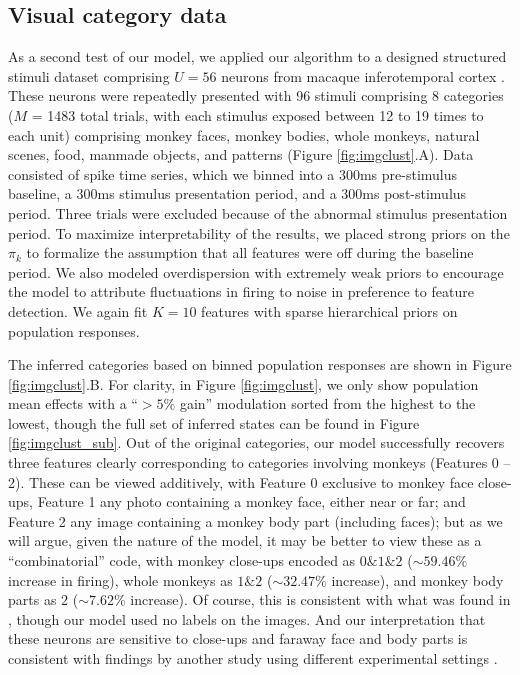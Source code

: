 \documentclass[10pt,letterpaper]{article}
\begin{document}
\subsection*{Visual category data}
\label{it_neuron_expt}
As a second test of our model, we applied our algorithm to a designed structured stimuli dataset comprising $U = 56$ neurons from macaque inferotemporal cortex \cite{McMahon2014-qq}. These neurons were repeatedly presented with 96 stimuli comprising 8 categories ($M$ = 1483 total trials, with each stimulus exposed between 12 to 19 times to each unit) comprising monkey faces, monkey bodies, whole monkeys, natural scenes, food, manmade objects, and patterns (Figure \ref{fig:imgclust}.A). Data consisted of spike time series, which we binned into a 300ms pre-stimulus baseline, a 300ms stimulus presentation period, and a 300ms post-stimulus period. Three trials were excluded because of the abnormal stimulus presentation period. To maximize interpretability of the results, we placed strong priors on the $\pi_k$ to formalize the assumption that all features were off during the baseline period. We also modeled overdispersion with extremely weak priors to encourage the model to attribute fluctuations in firing to noise in preference to feature detection. We again fit $K = 10$ features with sparse hierarchical priors on population responses.

The inferred categories based on binned population responses are shown in Figure \ref{fig:imgclust}.B. For clarity, in Figure \ref{fig:imgclust}, we only show population mean effects with a ``$>5\%$ gain'' modulation sorted from the highest to the lowest, though the full set of inferred states can be found in Figure \ref{fig:imgclust_sub}. Out of the original categories, our model successfully recovers three features clearly corresponding to categories involving monkeys (Features 0 -- 2). These can be viewed additively, with Feature 0 exclusive to monkey face close-ups, Feature 1 any photo containing a monkey face, either near or far; and Feature 2 any image containing a monkey body part (including faces); but as we will argue, given the nature of the model, it may be better to view these as a ``combinatorial'' code, with monkey close-ups encoded as $0\& 1\& 2$ ($\sim 59.46\%$ increase in firing), whole monkeys as $1\& 2$ ($\sim 32.47\%$ increase), and monkey body parts as $2$ ($\sim 7.62\%$ increase). Of course, this is consistent with what was found in \cite{McMahon2014-qq}, though our model used no labels on the images. And our interpretation that these neurons are sensitive to close-ups and faraway face and body parts is consistent with findings by another study using different experimental settings \cite{McMahon5537}.
\end{document}
